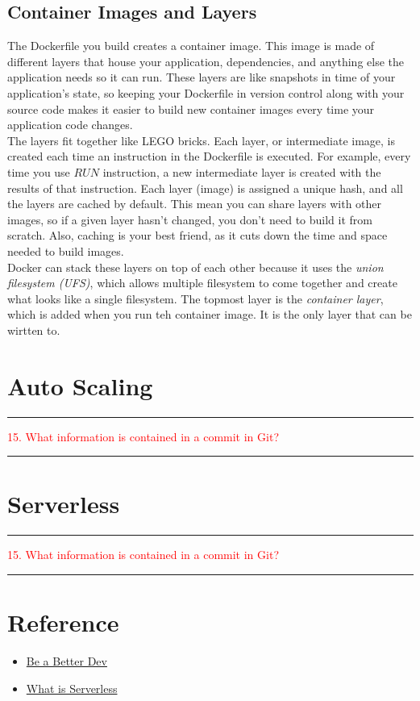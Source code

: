 \documentclass{article}
\begin{document}
\subsection{Container Images and Layers}
The Dockerfile you build creates a container image. This image is made of different layers that house your application, dependencies, and anything else the application needs so it can run. These layers are like snapshots in time of your application's state, so keeping your Dockerfile in version control along with your source code makes it easier to build new container images every time your application code changes. \\
The layers fit together like LEGO bricks. Each layer, or intermediate image, is created each time an instruction in the Dockerfile is executed. For example, every time you use $RUN$ instruction, a new intermediate layer is created with the results of that instruction. Each layer (image) is assigned a unique hash, and all the layers are cached by default.  This mean you can share layers with other images, so if  a given layer hasn't changed, you don't need to build it from scratch. Also, caching is your best friend, as it cuts down the time and space needed to build images. \\
Docker can stack these layers on top of each other because it uses the \textit{union filesystem (UFS)}, which allows multiple filesystem to come together and create what looks like a single filesystem. The topmost layer is the \textit{container layer}, which is added when you run teh container image. It is the only layer that can be wirtten to. 
\section{Auto Scaling}
\noindent
{\color{red} \rule{\linewidth}{0.5mm}}
\textcolor{red}{15. What information is contained in a commit  in Git?} \\
\noindent
{\color{red} \rule{\linewidth}{0.5mm}}
\section{Serverless}
\noindent
{\color{red} \rule{\linewidth}{0.5mm}}
\textcolor{red}{15. What information is contained in a commit  in Git?} \\
\noindent
{\color{red} \rule{\linewidth}{0.5mm}}
\section{Reference}
\begin{itemize}
    \item \href{https://www.youtube.com/watch?v=ZaA0kNm18pE}{Be a Better Dev}
    \item \href{https://www.redhat.com/en/topics/cloud-native-apps/what-is-serverless}{What is Serverless}
\end{itemize}
\end{document}
